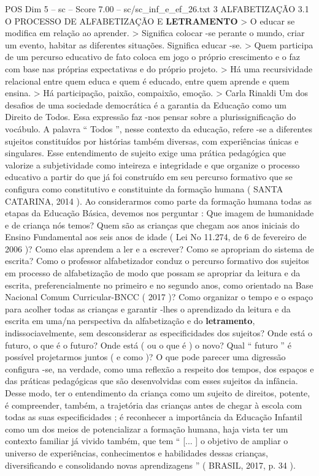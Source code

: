 \begin{textsample}{POS Dim 5 – sc – Score 7.00 – sc/sc\_inf\_e\_ef\_26.txt}  \label{ex:f5_pos_033}
3 ALFABETIZAÇÃO 3.1 O PROCESSO DE ALFABETIZAÇÃO E \textbf{LETRAMENTO} > O educar se modifica em relação ao aprender. > Significa colocar -se perante o mundo, criar um evento, habitar as diferentes situações.
Significa educar -se. > Quem participa de um percurso educativo de fato coloca em jogo o próprio crescimento e o faz com base nas próprias expectativas e do próprio projeto. > Há uma recursividade relacional entre quem educa e quem é educado, entre quem aprende e quem ensina. > Há participação, paixão, compaixão, emoção. > Carla Rinaldi Um dos desafios de uma sociedade democrática é a garantia da Educação como um Direito de Todos.
Essa expressão faz -nos pensar sobre a plurissignificação do vocábulo.
A palavra “ Todos ”, nesse contexto da educação, refere -se a diferentes sujeitos constituídos por histórias também diversas, com experiências únicas e singulares.
Esse entendimento de sujeito exige uma prática pedagógica que valorize a subjetividade como inteireza e integridade e que organize o processo educativo a partir do que já foi construído em seu percurso formativo que se configura como constitutivo e constituinte da formação humana ( SANTA CATARINA, 2014 ).
Ao considerarmos como parte da formação humana todas as etapas da Educação Básica, devemos nos perguntar : Que imagem de humanidade e de criança nós temos?
Quem são as crianças que chegam aos anos iniciais do Ensino Fundamental aos seis anos de idade ( Lei No 11.274, de 6 de fevereiro de 2006 )?
Como elas aprendem a ler e a escrever?
Como se apropriam do sistema de escrita?
Como o professor alfabetizador conduz o percurso formativo dos sujeitos em processo de alfabetização de modo que possam se apropriar da leitura e da escrita, preferencialmente no primeiro e no segundo anos, como orientado na Base Nacional Comum Curricular-BNCC ( 2017 )?
Como organizar o tempo e o espaço para acolher todas as crianças e garantir -lhes o aprendizado da leitura e da escrita em uma/na perspectiva da alfabetização e do \textbf{letramento}, indissociavelmente, sem desconsiderar as especificidades dos sujeitos?
Onde está o futuro, o que é o futuro?
Onde está ( ou o que é ) o novo?
Qual “ futuro ” é possível projetarmos juntos ( e como )?
O que pode parecer uma digressão configura -se, na verdade, como uma reflexão a respeito dos tempos, dos espaços e das práticas pedagógicas que são desenvolvidas com esses sujeitos da infância.
Desse modo, ter o entendimento da criança como um sujeito de direitos, potente, é compreender, também, a trajetória das crianças antes de chegar à escola com todas as suas especificidades ; é reconhecer a importância da Educação Infantil como um dos meios de potencializar a formação humana, haja vista ter um contexto familiar já vivido também, que tem “ [... ] o objetivo de ampliar o universo de experiências, conhecimentos e habilidades dessas crianças, diversificando e consolidando novas aprendizagens ” ( BRASIL, 2017, p. 34 ).

\end{textsample}
